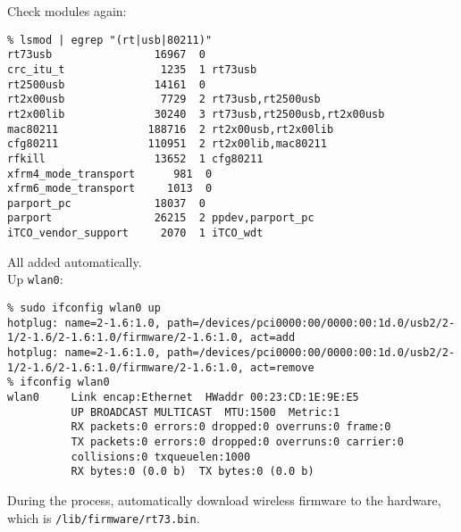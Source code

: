 \documentclass[a4paper]{report}
\begin{document}
Check modules again:
\begin{lstlisting}
% lsmod | egrep "(rt|usb|80211)"
rt73usb                16967  0 
crc_itu_t               1235  1 rt73usb
rt2500usb              14161  0 
rt2x00usb               7729  2 rt73usb,rt2500usb
rt2x00lib              30240  3 rt73usb,rt2500usb,rt2x00usb
mac80211              188716  2 rt2x00usb,rt2x00lib
cfg80211              110951  2 rt2x00lib,mac80211
rfkill                 13652  1 cfg80211
xfrm4_mode_transport      981  0 
xfrm6_mode_transport     1013  0 
parport_pc             18037  0 
parport                26215  2 ppdev,parport_pc
iTCO_vendor_support     2070  1 iTCO_wdt
\end{lstlisting}
All added automatically.\\
Up {\tt wlan0}:
\begin{lstlisting}
% sudo ifconfig wlan0 up
hotplug: name=2-1.6:1.0, path=/devices/pci0000:00/0000:00:1d.0/usb2/2-1/2-1.6/2-1.6:1.0/firmware/2-1.6:1.0, act=add
hotplug: name=2-1.6:1.0, path=/devices/pci0000:00/0000:00:1d.0/usb2/2-1/2-1.6/2-1.6:1.0/firmware/2-1.6:1.0, act=remove
% ifconfig wlan0 
wlan0     Link encap:Ethernet  HWaddr 00:23:CD:1E:9E:E5  
          UP BROADCAST MULTICAST  MTU:1500  Metric:1
          RX packets:0 errors:0 dropped:0 overruns:0 frame:0
          TX packets:0 errors:0 dropped:0 overruns:0 carrier:0
          collisions:0 txqueuelen:1000 
          RX bytes:0 (0.0 b)  TX bytes:0 (0.0 b)
\end{lstlisting}
During the process, automatically download wireless firmware to the hardware, 
which is {\tt /lib/firmware/rt73.bin}.
\end{document}

